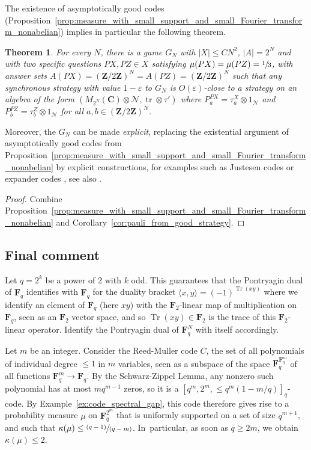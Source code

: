 \documentclass[JEP,XML,SOM,Unicode,published]{cedram}
\newcommand{\pspfrac}[2]{\sfrac{(#1)}{(#2)}}
\theoremstyle{plain}
\newtheorem{theorem}{Theorem}[section]
\theoremstyle{definition}
\newcommand{\C}{\mathbf{C}}
\newcommand{\Z}{\mathbf{Z}}
\newcommand{\cN}{\mathcal{N}}
\newcommand{\F}{\mathbf{F}}
\DeclareMathOperator{\tr}{tr}
\DeclareMathOperator{\Tr}{Tr}
\begin{document}
The existence of asymptotically good codes (Proposition~\ref{prop:measure_with_small_support_and_small_Fourier_transform_nonabelian}) implies in particular the following theorem.

\begin{theorem}\label{thm:mainTheorem}
For every $N$, there is a game $G_N$ with $|X|\leq C N^2$, $|A|=2^N$ and with two specific questions $PX,PZ \in X$ satisfying $\mu(PX)=\mu(PZ) = \sfrac 1 3$, with answer sets $A(PX)=(\Z/2\Z)^N = A(PZ)=(\Z/2\Z)^N$ such that any synchronous strategy with value $1-\varepsilon$ to $G_N$ is $O(\varepsilon)$-close to a strategy on an algebra of the form $(M_{2^N}(\C)\otimes \cN,\mathrm{\tr}\otimes \tau')$ where $P^{PX}_a = \tau^X_a\otimes 1_\cN$ and $P^{PZ}_b = \tau^Z_b\otimes 1_\cN$ for all $a,b\in (\Z/2\Z)^N$.
\end{theorem}
Moreover, the $G_N$ can be made \emph{explicit}, replacing the existential argument of asymptotically good codes from Proposition~\ref{prop:measure_with_small_support_and_small_Fourier_transform_nonabelian} by explicit constructions, for examples such as Justesen codes \cite{MR0465509} or expander codes \cite{MR2494807}, see also \cite{MR1996953}.
\begin{proof} Combine Proposition~\ref{prop:measure_with_small_support_and_small_Fourier_transform_nonabelian} and Corollary~\ref{cor:pauli_from_good_strategy}.
\end{proof}

\subsection{Final comment}\label{subsection:comparison}
Let $q=2^k$ be a power of $2$ with $k$ odd. This guarantees that the Pontryagin dual of $\F_q$ identifies with $\F_q$ for the duality bracket $\langle x,y\rangle = (-1)^{\Tr(xy)}$ where we identify an element of $\F_q$ (here $xy$) with the $\F_2$-linear map of multiplication on $\F_q$, seen as an $\F_2$ vector space, and so $\Tr(xy) \in \F_2$ is the trace of this $\F_2$-linear operator. Identify the Pontryagin dual of $\F_q^N$ with itself accordingly.

Let $m$ be an integer. Consider the Reed-Muller code $C$, the set of all polynomials of individual degree $\leq 1$ in $m$ variables, seen as a subspace of the space $\F_q^{\F_q^m}$ of all functions $\F_q^m\to \F_q$. By the Schwarz-Zippel Lemma, any nonzero such polynomial has at most $mq^{m-1}$ zeros, so it is a $[q^m,2^m,\leq q^m(1-m/q)]_q$-code. By Example~\ref{ex:code_spectral_gap}, this code therefore gives rise to a probability measure $\mu$ on $\F_q^{2^m}$ that is uniformly supported on a set of size $q^{m+1}$, and such that $\kappa(\mu) \leq \pspfrac{q-1}{q-m}$. In~particular, as soon as $q \geq 2m$, we obtain $\kappa(\mu) \leq 2$.
\end{document}
